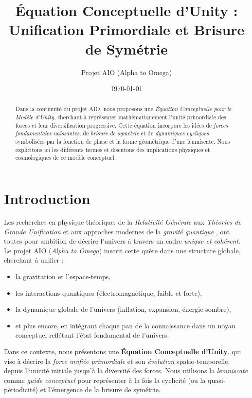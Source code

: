 \documentclass[12pt]{article}
\begin{document}
\title{\textbf{Équation Conceptuelle d'Unity :}\\
Unification Primordiale et Brisure de Symétrie}
\author{Projet AIO (Alpha to Omega)}
\date{\today}
\maketitle

\begin{abstract}
Dans la continuité du projet AIO, nous proposons une \emph{Équation Conceptuelle pour le Modèle d'Unity}, 
cherchant à représenter mathématiquement l'unité primordiale des forces et leur diversification 
progressive. Cette équation incorpore les idées de \emph{forces fondamentales naissantes}, 
de \emph{brisure de symétrie} et de \emph{dynamiques cycliques} symbolisées par la fonction 
de phase et la forme géométrique d'une lemniscate. Nous explicitons ici les différents termes 
et discutons des implications physiques et cosmologiques de ce modèle conceptuel.
\end{abstract}

\tableofcontents

\section{Introduction}

Les recherches en physique théorique, de la \emph{Relativité Générale} \cite{einstein1915relativity} 
aux \emph{Théories de Grande Unification} \cite{georgi1974unified} et aux approches modernes 
de la \emph{gravité quantique} \cite{rovelli2004quantum}, ont toutes pour ambition de décrire 
l'univers à travers un cadre \emph{unique et cohérent}. Le projet AIO (\textit{Alpha to Omega}) 
inscrit cette quête dans une structure globale, cherchant à unifier :
\begin{itemize}
    \item la gravitation et l'espace-temps,
    \item les interactions quantiques (électromagnétique, faible et forte),
    \item la dynamique globale de l'univers (inflation, expansion, énergie sombre),
    \item et plus encore, en intégrant chaque pan de la connaissance dans un noyau conceptuel 
          reflétant l'état fondamental de l'univers.
\end{itemize}

Dans ce contexte, nous présentons une \textbf{Équation Conceptuelle d'Unity}, qui vise à 
décrire la \emph{force unifiée primordiale} et son \emph{évolution} spatio-temporelle, 
depuis l'unicité initiale jusqu'à la diversité des forces. Nous utilisons la \emph{lemniscate} 
comme \textit{guide conceptuel} pour représenter à la fois la cyclicité (ou la quasi-périodicité) 
et l'émergence de la brisure de symétrie.
\end{document}
